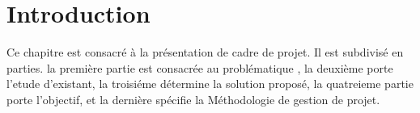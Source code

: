 	\section{Introduction }
Ce chapitre est consacré à la présentation de cadre de projet. Il est subdivisé en  parties.
la première partie est consacrée au problématique , la deuxième
porte l'etude d'existant, la troisiéme détermine la  solution proposé, la quatreieme partie porte l’objectif, et la dernière spécifie la Méthodologie de gestion de projet.